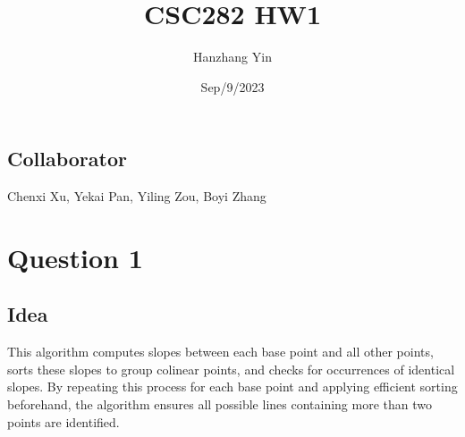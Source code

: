 \documentclass{article}
\title{CSC282 HW1}
\author{Hanzhang Yin}
\date{Sep/9/2023}
\begin{document}
\maketitle

\subsection*{Collaborator}
Chenxi Xu, Yekai Pan, Yiling Zou, Boyi Zhang

\section*{Question 1}

\subsection*{Idea}
This algorithm computes slopes between each base point and all other points, sorts these slopes to group colinear points, and checks for occurrences of identical slopes. By repeating this process for each base point and applying efficient sorting beforehand, the algorithm ensures all possible lines containing more than two points are identified.
\end{document}
